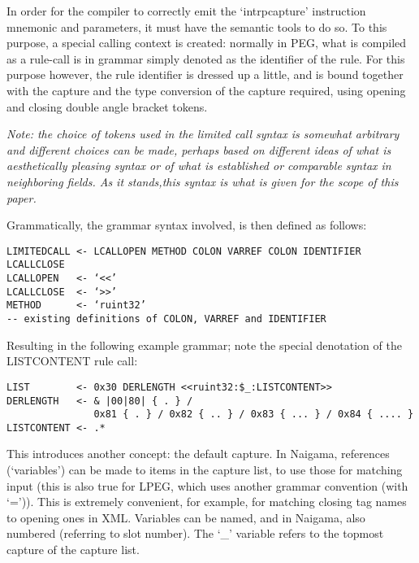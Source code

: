 In order for the compiler to correctly emit the ‘intrpcapture’ 
instruction mnemonic and parameters, it must have the semantic tools to do 
so. To this purpose, a special calling context is created: normally in 
PEG, what is compiled as a rule-call is in grammar simply denoted as the 
identifier of the rule. For this purpose however, the rule identifier is 
dressed up a little, and is bound together with the capture and the type 
conversion of the capture required, using opening and closing double angle 
bracket tokens.

\hline
\textit{
Note: the choice of tokens used in the limited call syntax
is somewhat arbitrary and different
choices can be made, perhaps based on different ideas of what is
aesthetically pleasing syntax or of what is established or comparable
syntax in neighboring fields.
As it stands,this syntax is what is given for the scope of this paper.
}
\hline

Grammatically, the grammar syntax involved, is then defined as follows:

\begin{changemargin}{-60mm}{0mm}
\begin{myquote}
\begin{verbatim}
LIMITEDCALL <- LCALLOPEN METHOD COLON VARREF COLON IDENTIFIER LCALLCLOSE
LCALLOPEN   <- ‘<<’
LCALLCLOSE  <- ‘>>’
METHOD      <- ‘ruint32’
-- existing definitions of COLON, VARREF and IDENTIFIER
\end{verbatim}
\end{myquote}
\end{changemargin}

Resulting in the following example grammar; note the special denotation of 
the LISTCONTENT rule call:

\begin{changemargin}{-60mm}{0mm}
\begin{myquote}
\begin{verbatim}
LIST        <- 0x30 DERLENGTH <<ruint32:$_:LISTCONTENT>>
DERLENGTH   <- & |00|80| { . } /
               0x81 { . } / 0x82 { .. } / 0x83 { ... } / 0x84 { .... }
LISTCONTENT <- .*
\end{verbatim}
\end{myquote}
\end{changemargin}

This introduces another concept: the default capture. In Naigama, 
references (‘variables’) can be made to items in the capture list, to 
use those for matching input (this is also true for LPEG, which uses 
another grammar convention (with ‘=’)). This is extremely convenient, 
for example, for matching closing tag names to opening ones in XML. 
Variables can be named, and in Naigama, also numbered (referring to slot 
number). The ‘\_’ variable refers to the topmost capture of the capture 
list.

